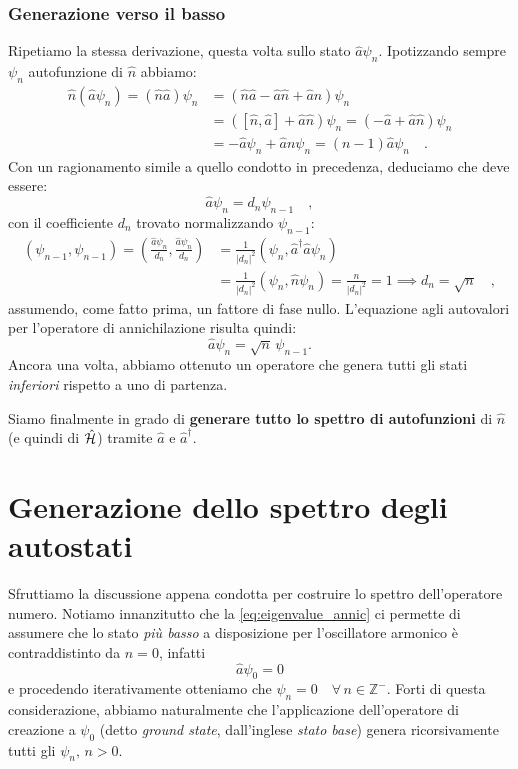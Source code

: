 \subsubsection{Generazione verso il basso}
Ripetiamo la stessa derivazione, questa volta sullo stato $\hat{a}\psi_n$. Ipotizzando sempre $\psi_n$ autofunzione di $\hat{n}$ abbiamo:
\[
    \begin{aligned}
        \hat{n}(\hat{a} \psi_n) = (\hat{n}\hat{a}) \psi_n &= (\hat{n}\hat{a} - \hat{a}\hat{n} + \hat{a}\hat{n} ) \psi_n \\
        &= ([\hat{n},\hat{a}]+\hat{a}\hat{n})\psi_n = (-\hat{a}+\hat{a}\hat{n})\psi_n \\
        &= -\hat{a}\psi_n + \hat{a}n\psi_n = (n-1)\hat{a}\psi_n \quad.
    \end{aligned}
\]
Con un ragionamento simile a quello condotto in precedenza, deduciamo che deve essere:
\[
    \hat{a}\psi_n = d_n \psi_{n-1} \quad,
\]
con il coefficiente $d_n$ trovato normalizzando $\psi_{n-1}$:
\[
    \begin{aligned}
        (\psi_{n-1}, \psi_{n-1}) = \left( \frac{\hat{a}\psi_n}{d_n}, \frac{\hat{a}\psi_n}{d_n} \right) &= \frac{1}{|d_n|^2} (\psi_n, \hat{a}^\dagger\hat{a}\psi_n) \\
        &= \frac{1}{|d_n|^2} (\psi_n, \hat{n}\psi_n) = \frac{n}{|d_n|^2} = 1 \implies d_n = \sqrt{n} \quad,
    \end{aligned}
\]
assumendo, come fatto prima, un fattore di fase nullo. L'equazione agli autovalori per l'operatore di annichilazione risulta quindi:
\begin{equation}
    \hat{a}\psi_n = \sqrt{n} \, \psi_{n-1}.
    \label{eq:eigenvalue_annic}
\end{equation}
Ancora una volta, abbiamo ottenuto un operatore che genera tutti gli stati \emph{inferiori} rispetto a uno di partenza. 

Siamo finalmente in grado di \textbf{generare tutto lo spettro di autofunzioni} di $\hat{n}$ (e quindi di $\hat{\mathcal{H}}$) tramite $\hat{a}$ e $\hat{a}^\dagger$.

\section{Generazione dello spettro degli autostati}
Sfruttiamo la discussione appena condotta per costruire lo spettro dell'operatore numero. Notiamo innanzitutto che la \eqref{eq:eigenvalue_annic} ci permette di assumere che lo stato \emph{più basso} a disposizione per l'oscillatore armonico è contraddistinto da $ n = 0$, infatti
\begin{equation}
    \hat{a} \psi_0 = 0 \label{eq:ground_state}
\end{equation}
e procedendo iterativamente otteniamo che $\psi_n = 0 \quad \forall \, n \in \mathbb{Z}^-$. Forti di questa considerazione, abbiamo naturalmente che l'applicazione dell'operatore di creazione a $\psi_0$ (detto \emph{ground state}, dall'inglese \emph{stato base}) genera ricorsivamente tutti gli $\psi_n, \, n > 0$. 

